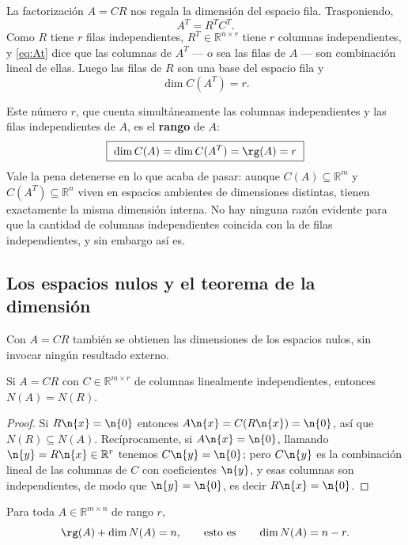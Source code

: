 La factorización $A=CR$ nos regala la dimensión del espacio fila. Trasponiendo,
\begin{equation}
A^T = R^T C^T .
\label{eq:At}
\end{equation}
Como $R$ tiene $r$ filas independientes, $R^T\in\mathbb{R}^{n\times r}$ tiene
$r$ columnas independientes, y \eqref{eq:At} dice que las columnas de $A^T$
--- o sea las filas de $A$ --- son combinación lineal de ellas. Luego las filas
de $R$ son una base del espacio fila y
\[
\dim C(A^T) = r .
\]

Este número $r$, que cuenta simultáneamente las columnas independientes y las
filas independientes de $A$, es el \textbf{rango} de $A$:
\[
\boxed{\ \dim C(A) = \dim C(A^T) = \rg(A) = r\ }
\]
Vale la pena detenerse en lo que acaba de pasar: aunque $C(A) \subseteq
\mathbb{R}^m$ y $C(A^T) \subseteq \mathbb{R}^n$ viven en espacios ambientes de
dimensiones distintas, tienen exactamente la misma dimensión interna. No hay
ninguna razón evidente para que la cantidad de columnas independientes coincida
con la de filas independientes, y sin embargo así es.

\subsection{Los espacios nulos y el teorema de la dimensión}

Con $A=CR$ también se obtienen las dimensiones de los espacios nulos, sin
invocar ningún resultado externo.

\begin{proposition}\label{prop:NA-NR}
Si $A = CR$ con $C\in\mathbb{R}^{m\times r}$ de columnas linealmente
independientes, entonces $N(A) = N(R)$.
\end{proposition}

\begin{proof}
Si $R\n{x} = \n{0}$ entonces $A\n{x} = C(R\n{x}) = \n{0}$, así que
$N(R)\subseteq N(A)$. Recíprocamente, si $A\n{x} = \n{0}$, llamando
$\n{y} = R\n{x}\in\mathbb{R}^r$ tenemos $C\n{y} = \n{0}$; pero $C\n{y}$ es la
combinación lineal de las columnas de $C$ con coeficientes $\n{y}$, y esas
columnas son independientes, de modo que $\n{y} = \n{0}$, es decir
$R\n{x} = \n{0}$.
\end{proof}

\begin{theorem}\label{teo:rango-nulidad}
Para toda $A\in\mathbb{R}^{m\times n}$ de rango $r$,
\[
\rg(A) + \dim N(A) = n,
\qquad\text{esto es}\qquad
\dim N(A) = n-r .
\]
\end{theorem}

